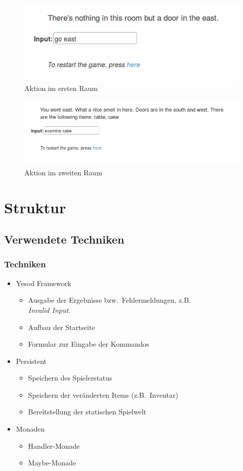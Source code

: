 \documentclass[hyperref={pdfpagelabels=false}]{beamer}
\begin{document}
\begin{frame}
  \begin{figure}
    \includegraphics[scale=0.25]{screenshots/2015-03-25-104448_467x168_scrot.png}
    \caption{Aktion im ersten Raum}
  \end{figure}
  \begin{figure}
    \includegraphics[scale=0.4]{screenshots/2015-03-25-104521_703x213_scrot.png}
    \caption{Aktion im zweiten Raum}
  \end{figure}
\end{frame}
\section{Struktur}
\subsection{Verwendete Techniken}
\begin{frame}
  \frametitle{Techniken}
  \begin{itemize}
    \item Yesod Framework
      \begin{itemize}
        \item Ausgabe der Ergebnisse bzw.\ Fehlermeldungen, z.B.\\ \emph{Invalid Input.}
        \item Aufbau der Startseite
        \item Formular zur Eingabe der Kommandos
      \end{itemize}
    \item Persistent
      \begin{itemize}
        \item Speichern des Spielerstatus
        \item Speichern der veränderten Items (z.B.\ Inventar)
        \item Bereitstellung der statischen Spielwelt
      \end{itemize}
    \item Monaden
      \begin{itemize}
        \item Handler-Monade
        \item Maybe-Monade
      \end{itemize}
  \end{itemize}
\end{frame}
\end{document}
